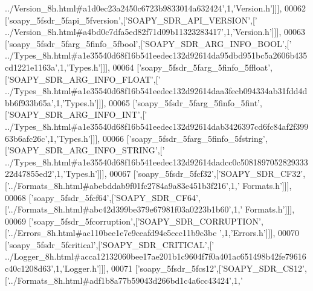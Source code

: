 \begin{DoxyCode}
{      ../Version\_8h.html#a1d0ec23a2450c6723b9833014a632424'},1,\textcolor{stringliteral}{'Version.h'}]]],
00062   [\textcolor{stringliteral}{'soapy\_5fsdr\_5fapi\_5fversion'},[\textcolor{stringliteral}{'SOAPY\_SDR\_API\_VERSION'},[\textcolor{stringliteral}{'
      ../Version\_8h.html#a4bd0c7dfa5ed82f71d09b11323283417'},1,\textcolor{stringliteral}{'Version.h'}]]],
00063   [\textcolor{stringliteral}{'soapy\_5fsdr\_5farg\_5finfo\_5fbool'},[\textcolor{stringliteral}{'SOAPY\_SDR\_ARG\_INFO\_BOOL'},[\textcolor{stringliteral}{'
      ../Types\_8h.html#a1e35540d68f16b541eedec132d92614da95dbd951bc5a2606b435cd1221e1163a'},1,\textcolor{stringliteral}{'Types.h'}]]],
00064   [\textcolor{stringliteral}{'soapy\_5fsdr\_5farg\_5finfo\_5ffloat'},[\textcolor{stringliteral}{'SOAPY\_SDR\_ARG\_INFO\_FLOAT'},[\textcolor{stringliteral}{'
      ../Types\_8h.html#a1e35540d68f16b541eedec132d92614daa3fecb094334ab31fdd4dbb6f933b65a'},1,\textcolor{stringliteral}{'Types.h'}]]],
00065   [\textcolor{stringliteral}{'soapy\_5fsdr\_5farg\_5finfo\_5fint'},[\textcolor{stringliteral}{'SOAPY\_SDR\_ARG\_INFO\_INT'},[\textcolor{stringliteral}{'
      ../Types\_8h.html#a1e35540d68f16b541eedec132d92614dab3426397cd6fc84af2f39963b6afc26c'},1,\textcolor{stringliteral}{'Types.h'}]]],
00066   [\textcolor{stringliteral}{'soapy\_5fsdr\_5farg\_5finfo\_5fstring'},[\textcolor{stringliteral}{'SOAPY\_SDR\_ARG\_INFO\_STRING'},[\textcolor{stringliteral}{'
      ../Types\_8h.html#a1e35540d68f16b541eedec132d92614dadcc0c508189705282933322d47855ed2'},1,\textcolor{stringliteral}{'Types.h'}]]],
00067   [\textcolor{stringliteral}{'soapy\_5fsdr\_5fcf32'},[\textcolor{stringliteral}{'SOAPY\_SDR\_CF32'},[\textcolor{stringliteral}{'../Formats\_8h.html#abebddab9f01fc2784a9a83e451b3f216'},1,\textcolor{stringliteral}{'
      Formats.h'}]]],
00068   [\textcolor{stringliteral}{'soapy\_5fsdr\_5fcf64'},[\textcolor{stringliteral}{'SOAPY\_SDR\_CF64'},[\textcolor{stringliteral}{'../Formats\_8h.html#abc42d399be379e67981f03a0223b1b60'},1,\textcolor{stringliteral}{'
      Formats.h'}]]],
00069   [\textcolor{stringliteral}{'soapy\_5fsdr\_5fcorruption'},[\textcolor{stringliteral}{'SOAPY\_SDR\_CORRUPTION'},[\textcolor{stringliteral}{'../Errors\_8h.html#ac110bee1e7e9ceafd94e5ccc11b9c3bc
      '},1,\textcolor{stringliteral}{'Errors.h'}]]],
00070   [\textcolor{stringliteral}{'soapy\_5fsdr\_5fcritical'},[\textcolor{stringliteral}{'SOAPY\_SDR\_CRITICAL'},[\textcolor{stringliteral}{'
      ../Logger\_8h.html#acca12132060bee17ae201b1c9604f7f0a401ac651498b42fe79616c40c1208d63'},1,\textcolor{stringliteral}{'Logger.h'}]]],
00071   [\textcolor{stringliteral}{'soapy\_5fsdr\_5fcs12'},[\textcolor{stringliteral}{'SOAPY\_SDR\_CS12'},[\textcolor{stringliteral}{'../Formats\_8h.html#adf1b8a77b59043d266bd1c4a6cc43424'},1,\textcolor{stringliteral}{'
}
\end{DoxyCode}
